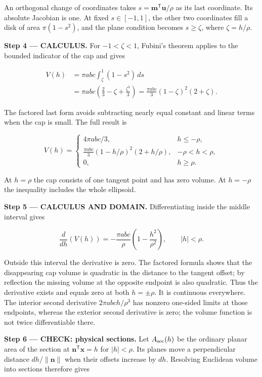 \documentclass[11pt,oneside,openany]{book}
\begin{document}
An orthogonal change of coordinates takes \(s=\mathbf m^{\mathsf T}\mathbf u/\rho\) as its last coordinate. Its absolute Jacobian is one. At fixed \(s\in[-1,1]\), the other two coordinates fill a disk of area \(\pi(1-s^2)\), and the plane condition becomes \(s\ge\zeta\), where \(\zeta=h/\rho\).

\endgroup
\textbf{Step 4 --- CALCULUS.} For \(-1<\zeta<1\), Fubini's theorem applies to the bounded indicator of the cap and gives

\[
\begin{aligned}
V(h)&=\pi abc\int_\zeta^1(1-s^2)\,ds\\
&=\pi abc\left(\frac23-\zeta+\frac{\zeta^3}{3}\right)
=\frac{\pi abc}{3}(1-\zeta)^2(2+\zeta).
\end{aligned}
\]

The factored last form avoids subtracting nearly equal constant and linear terms when the cap is small. The full result is

\[
V(h)=\begin{cases}
4\pi abc/3,&h\le-\rho,\\
\displaystyle\frac{\pi abc}{3}(1-h/\rho)^2(2+h/\rho),&-\rho<h<\rho,\\
0,&h\ge\rho.
\end{cases}
\]

At \(h=\rho\) the cap consists of one tangent point and has zero volume. At \(h=-\rho\) the inequality includes the whole ellipsoid.

\begin{DomainStep}
\textbf{Step 5 --- CALCULUS AND DOMAIN.} Differentiating inside the middle interval gives

\[
\frac{d}{dh}(V(h))=-\frac{\pi abc}{\rho}\left(1-\frac{h^2}{\rho^2}\right),
\qquad |h|<\rho.
\]

Outside this interval the derivative is zero. The factored formula shows that the disappearing cap volume is quadratic in the distance to the tangent offset; by reflection the missing volume at the opposite endpoint is also quadratic. Thus the derivative exists and equals zero at both \(h=\pm\rho\). It is continuous everywhere. The interior second derivative \(2\pi abc h/\rho^3\) has nonzero one-sided limits at those endpoints, whereas the exterior second derivative is zero; the volume function is not twice differentiable there.

\end{DomainStep}
\textbf{Step 6 --- CHECK: physical sections.} Let \(A_{\rm sec}(h)\) be the ordinary planar area of the section at \(\mathbf n^{\mathsf T}\mathbf x=h\) for \(|h|<\rho\). Its planes move a perpendicular distance \(dh/\|\mathbf n\|\) when their offsets increase by \(dh\). Resolving Euclidean volume into sections therefore gives
\end{document}
